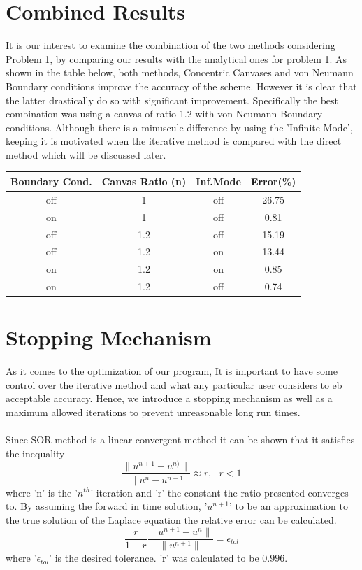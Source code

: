 \documentclass[a4paper]{article}
\begin{document}
\section{Combined Results}
It is our interest to examine the combination of the two methods considering Problem 1, by comparing our results with the analytical ones for problem 1. As shown in the table below, both methods, Concentric Canvases and von Neumann Boundary conditions improve the accuracy of the scheme. However it is clear that the latter drastically do so with significant improvement. Specifically the best combination was using a canvas of ratio 1.2 with von Neumann Boundary conditions. Although there is a minuscule difference by using the 'Infinite Mode', keeping it is motivated when the iterative method is compared with the direct method which will be discussed later.  
\begin{table}[h]
\centering
\begin{tabular}{c c c | c}
Boundary Cond. & Canvas Ratio (n) & Inf.Mode & Error(\%) \\
\hline
off & 1 & off & 26.75\\
 on & 1 & off & 0.81\\
off & 1.2 & off & 15.19\\
off & 1.2 & on & 13.44\\
on & 1.2 & on & 0.85 \\
on & 1.2 & off & 0.74 \\
\end{tabular}
\end{table}


\section{Stopping Mechanism}
As it comes to the optimization of our program,
It is important to have some control over the iterative method and what any particular user considers to eb acceptable accuracy. Hence, we introduce a stopping mechanism as well as a maximum allowed iterations to prevent unreasonable long run times. \\
\\
Since SOR method is a linear convergent method it can be shown that it satisfies the inequality 
\begin{equation}
\frac{\|u^{n+1}-u^{n)} \|}{\|u^{n}-u^{n-1}} \approx r, \ \ \ r < 1
\end{equation}
where 'n' is the '$n^{th}$' iteration and 'r' the constant the ratio presented converges to.\cite{stop}
By assuming the forward in time solution, '$u^{n+1}$' to be an approximation to the true solution of the Laplace equation the relative error can be calculated. 
\begin{equation}
\frac{r}{1-r} \frac{\|u^{n+1}-u^{n} \|}{\|u^{n+1}\|} = \epsilon_{tol}
\end{equation}
where '$\epsilon_{tol}$' is the desired tolerance. 'r' was calculated to be $0.996$. 
\end{document}
